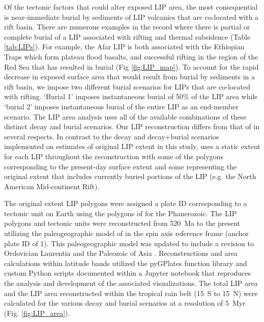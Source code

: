 \documentclass[11pt,letterpaper]{article}
\begin{document}
Of the tectonic factors that could alter exposed LIP area, the most consequential is near-immediate burial by sediments of LIP volcanics that are co-located with a rift basin. There are numerous examples in the record where there is partial or complete burial of a LIP associated with rifting and thermal subsidence (Table \ref{tab:LIPs}). For example, the Afar LIP is both associated with the Ethiopian Traps which form plateau flood basalts, and successful rifting in the region of the Red Sea that has resulted in burial (Fig \ref{fig:LIP_map}). To account for the rapid decrease in exposed surface area that would result from burial by sediments in a rift basin, we impose two different burial scenarios for LIPs that are co-located with rifting. `Burial 1' imposes instantaneous burial of 50$\%$ of the LIP area while `burial 2' imposes instantaneous burial of the entire LIP as an end-member scenario. The LIP area analysis uses all of the available combinations of these distinct decay and burial scenarios. Our LIP reconstruction differs from that of \citet{Johansson2018a} in several respects. In contrast to the decay and decay+burial scenarios implemented on estimates of original LIP extent in this study, \citet{Johansson2018a} uses a static extent for each LIP throughout the reconstruction with some of the polygons corresponding to the present-day surface extent and some representing the original extent that includes currently buried portions of the LIP (e.g. the North American Mid-continent Rift).

The original extent LIP polygons were assigned a plate ID corresponding to a tectonic unit on Earth using the polygons of \citet{Torsvik2016a} for the Phanerozoic. The LIP polygons and tectonic units were reconstructed from 520~Ma to the present utilizing the paleogeographic model of \citet{Torsvik2016a} in the spin axis reference frame (anchor plate ID of 1). This paleogeographic model was updated to include a revision to Ordovician Laurentia \citep{Swanson-Hysell2017a} and the Paleozoic of Asia \citep{Domeier2018a}. Reconstructions and area calculations within latitude bands utilized the pyGPlates function library and custom Python scripts documented within a Jupyter notebook that reproduces the analysis and development of the associated visualizations. The total LIP area and the LIP area reconstructed within the tropical rain belt (15\textdegree~S to 15\textdegree~N) were calculated for the various decay and burial scenarios at a resolution of 5~Myr (Fig. \ref{fig:LIP_area}).
\end{document}
